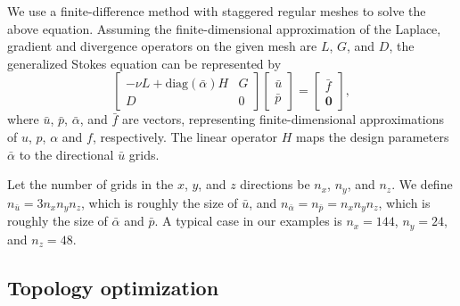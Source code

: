 
We use a finite-difference method with staggered regular meshes to
solve the above equation. Assuming the finite-dimensional
approximation of the Laplace, gradient and divergence operators on the
given mesh are $L$, $G$, and $D$, the generalized Stokes equation can
be represented by
\begin{equation}
  \label{discretestokes}
  \left[\begin{matrix}
      -\nu L + \text{diag}(\bar{\alpha})H & G\\
             D                            &  0
    \end{matrix} \right]
  \left[\begin{matrix}
      \bar{u} \\ \bar{p}
    \end{matrix} \right]=
  \left[\begin{matrix}
      \bar{f} \\ \mathbf{0}
    \end{matrix} \right],
\end{equation}
where $\bar{u}$, $\bar{p}$, $\bar{\alpha}$, and $\bar{f}$ are vectors, representing
finite-dimensional approximations of $u$, $p$, $\alpha$ and $f$,
respectively. The linear operator $H$ maps the design parameters
$\bar{\alpha}$ to the directional $\bar{u}$ grids.



Let the number of grids in the $x$, $y$, and $z$ directions be $n_x$,
$n_y$, and $n_z$. We define $n_{\bar{u}} = 3n_x n_y n_z$, which is
roughly the size of $\bar{u}$, and $n_{\bar{\alpha}}=n_{\bar{p}} = n_x
n_y n_z$, which is roughly the size of $\bar{\alpha}$ and $\bar{p}$. A
typical case in our examples is $n_x = 144$, $n_y=24$, and $n_z=48$.



\subsection{Topology optimization}

